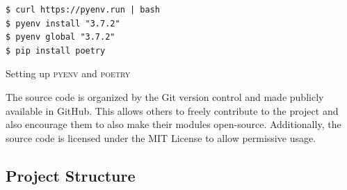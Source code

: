 \begin{listing}
    \begin{verbatim}
$ curl https://pyenv.run | bash
$ pyenv install "3.7.2"
$ pyenv global "3.7.2"
$ pip install poetry
    \end{verbatim}
    \caption{Setting up \textsc{pyenv} and \textsc{poetry}}
    \label{lst:impl.setup.pyenv.poetry}
\end{listing}

The source code is organized by the Git version control and made publicly available in GitHub.
This allows others to freely contribute to the project and also encourage them to also make their modules open-source.
Additionally, the source code is licensed under the MIT License to allow permissive usage.

\subsection{Project Structure}
\label{sec:impl.structure}

